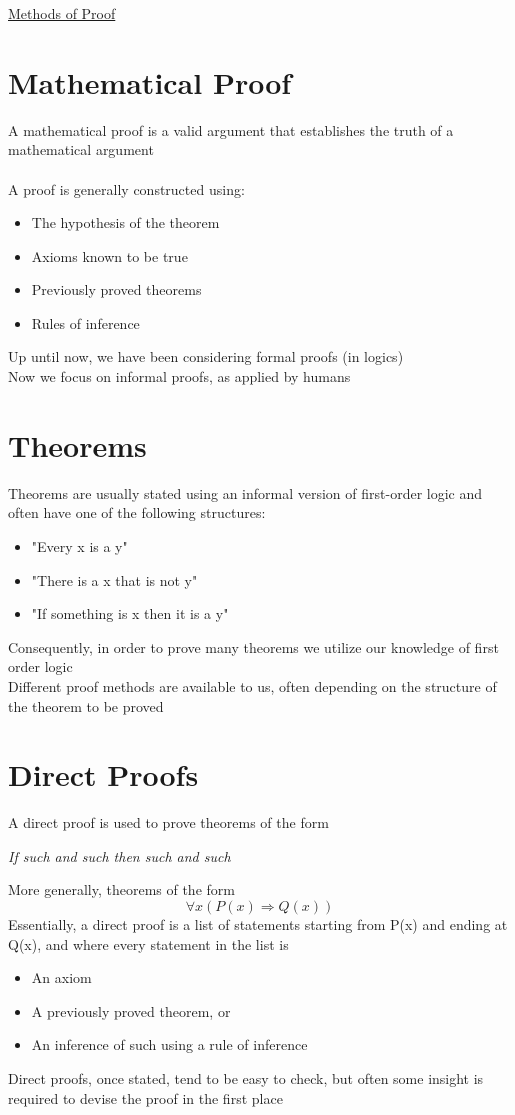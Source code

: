 \documentclass{article}[18pt]
\begin{document}
\begin{center}
\underline{\huge Methods of Proof}
\end{center}
\section{Mathematical Proof}
A mathematical proof is a valid argument that establishes the truth of a mathematical argument\\
\\
A proof is generally constructed using:
\begin{itemize}
	\item The hypothesis of the theorem
	\item Axioms known to be true
	\item Previously proved theorems
	\item Rules of inference
\end{itemize}
Up until now, we have been considering formal proofs (in logics)\\
Now we focus on informal proofs, as applied by humans
\section{Theorems}
Theorems are usually stated using an informal version of first-order logic and often have one of the following structures:
\begin{itemize}
	\item "Every x is a y"
	\item "There is a x that is not y"
	\item "If something is x then it is a y"
\end{itemize}
Consequently, in order to prove many theorems we utilize our knowledge of first order logic\\
Different proof methods are available to us, often depending on the structure of the theorem to be proved
\section{Direct Proofs}
A direct proof is used to prove theorems of the form
\begin{center}
	\textit{If such and such then such and such}
\end{center}
More generally, theorems of the form
$$\forall x(P(x)\Rightarrow Q(x))$$
Essentially, a direct proof is a list of statements starting from P(x) and ending at Q(x), and where every statement in the list is
\begin{itemize}
	\item An axiom
	\item A previously proved theorem, or
	\item An inference of such using a rule of inference
\end{itemize}
Direct proofs, once stated, tend to be easy to check, but often some insight is required to devise the proof in the first place
\end{document}
